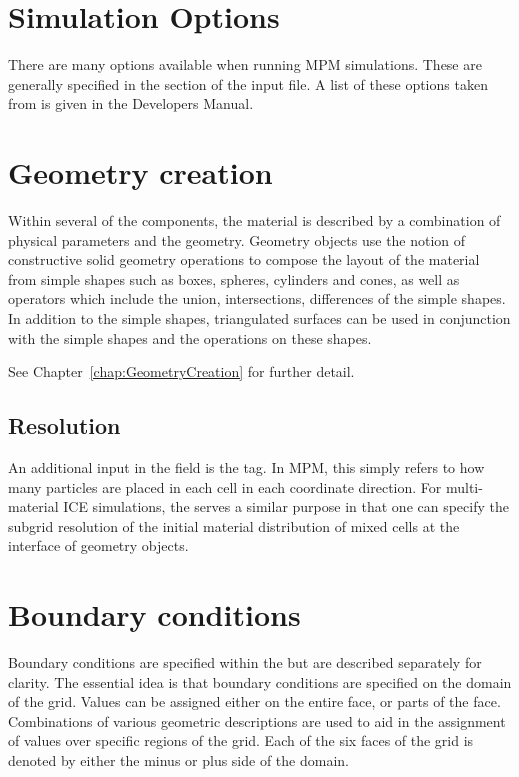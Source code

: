 \section{Simulation Options} \label{Sec:SimulationOptions}


There are many options available when running MPM simulations.  These
are generally specified in the  section of the input file.
A list of these options taken from 
  is given in the \Vaango
Developers Manual.

\section{Geometry creation} 
Within several of the components, the material is described by a
combination of physical parameters and the geometry.  Geometry objects
use the notion of constructive solid geometry operations to compose
the layout of the material from simple shapes such as boxes, spheres,
cylinders and cones, as well as operators which include the union,
intersections, differences of the simple shapes.  In addition to the
simple shapes, triangulated surfaces can be used in conjunction with
the simple shapes and the operations on these shapes.  

See Chapter~\ref{chap:GeometryCreation} for further detail.

\subsection{Resolution}
An additional input in the  field is the
 tag.  In MPM, this simply refers to how many particles
are placed in each cell in each coordinate direction.  For multi-material ICE
simulations, the  serves a similar purpose in that one
can specify the subgrid resolution of the initial material distribution
of mixed cells at the interface of geometry objects.

\section{Boundary conditions}\label{sec:ucf_bc}

Boundary conditions are specified within the 
but are described separately for clarity.  The essential idea is that
boundary conditions are specified on the domain of the grid.  Values
can be assigned either on the entire face, or parts of the face.
Combinations of various geometric descriptions are used to aid in the
assignment of values over specific regions of the grid.  Each of the
six faces of the grid is denoted by either the minus or plus side of
the domain.

